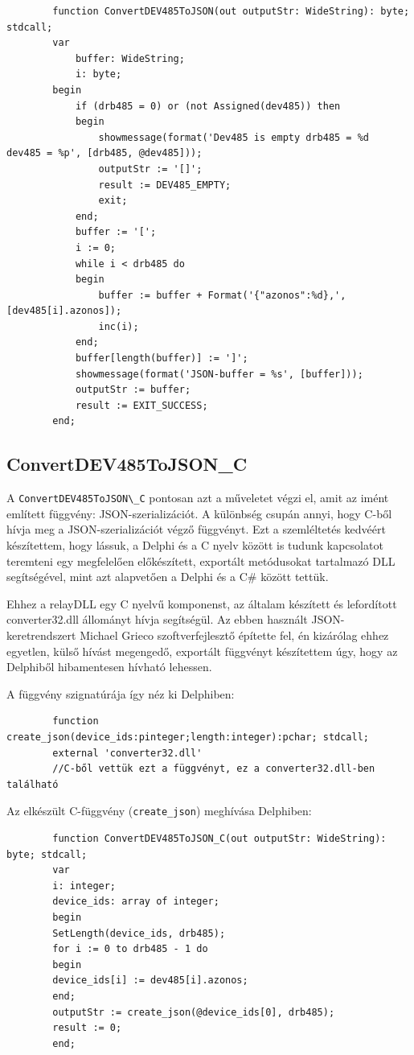 \documentclass[tocnopagenum]{thesis-ekf}
\begin{document}
	\begin{verbatim}
		function ConvertDEV485ToJSON(out outputStr: WideString): byte; stdcall;
		var
			buffer: WideString;
			i: byte;
		begin
			if (drb485 = 0) or (not Assigned(dev485)) then
			begin
				showmessage(format('Dev485 is empty drb485 = %d  dev485 = %p', [drb485, @dev485]));
				outputStr := '[]';
				result := DEV485_EMPTY;
				exit;
			end;
			buffer := '[';
			i := 0;
			while i < drb485 do
			begin
				buffer := buffer + Format('{"azonos":%d},', [dev485[i].azonos]);
				inc(i);
			end;
			buffer[length(buffer)] := ']'; 
			showmessage(format('JSON-buffer = %s', [buffer]));
			outputStr := buffer;
			result := EXIT_SUCCESS;
		end;
	\end{verbatim}
	\subsection{ConvertDEV485ToJSON\_C}
	A \verb*|ConvertDEV485ToJSON\_C| pontosan azt a műveletet végzi el, amit az imént említett függvény: JSON-szerializációt. A különbség csupán annyi, hogy C-ből hívja meg a JSON-szerializációt végző függvényt. Ezt a szemléltetés kedvéért készítettem, hogy lássuk, a Delphi és a C nyelv között is tudunk kapcsolatot teremteni egy megfelelően előkészített, exportált metódusokat tartalmazó DLL segítségével, mint azt alapvetően a Delphi és a C\# között tettük.
	
	Ehhez a relayDLL egy C nyelvű komponenst, az általam készített és lefordított converter32.dll állományt hívja segítségül. Az ebben használt JSON-keretrendszert Michael Grieco szoftverfejlesztő építette fel, én kizárólag ehhez egyetlen, külső hívást megengedő, exportált függvényt készítettem úgy, hogy az Delphiből hibamentesen hívható lehessen.\cite{mgrieco}

	A függvény szignatúrája így néz ki Delphiben:
	\begin{verbatim}
		function create_json(device_ids:pinteger;length:integer):pchar; stdcall; 
		external 'converter32.dll' 
		//C-ből vettük ezt a függvényt, ez a converter32.dll-ben található
	\end{verbatim}

	Az elkészült C-függvény (\verb*|create_json|) meghívása Delphiben:
	\begin{verbatim}
		function ConvertDEV485ToJSON_C(out outputStr: WideString): byte; stdcall;
		var
		i: integer;
		device_ids: array of integer;
		begin
		SetLength(device_ids, drb485);
		for i := 0 to drb485 - 1 do
		begin
		device_ids[i] := dev485[i].azonos;
		end;
		outputStr := create_json(@device_ids[0], drb485);
		result := 0;
		end;
	\end{verbatim}
	
\end{document}
